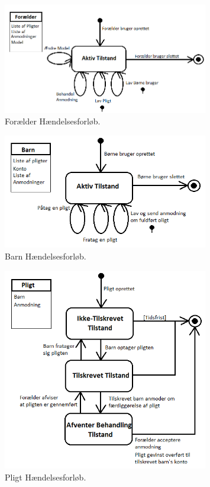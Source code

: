 \begin{figure}[H]
\centering
\includegraphics[width=0.8\textwidth]{Billeder/ForaelderForloeb.png}
\caption{Forælder Hændelsesforløb.}
\label{ForaelderHaendelsesforloeb}
\end{figure}

\begin{figure}[H]
\centering
\includegraphics[width=0.8\textwidth]{Billeder/BoernForloeb.png}
\caption{Barn Hændelsesforløb.}
\label{BarnHaendelsesforloeb}
\end{figure}

\begin{figure}[H]
\centering
\includegraphics[width=0.8\textwidth]{Billeder/PligtForloeb.png}
\caption{Pligt Hændelsesforløb.}
\label{PligtHaendelsesforloeb}
\end{figure}


